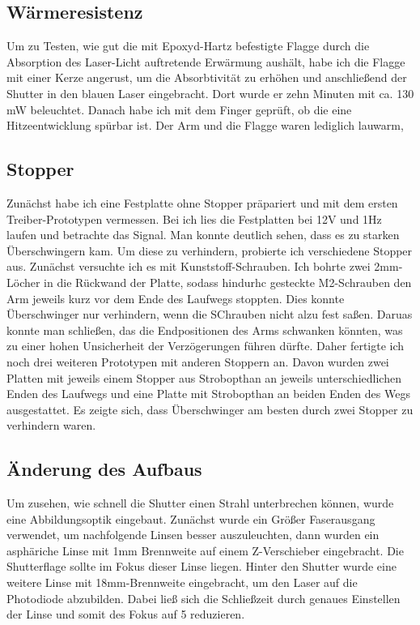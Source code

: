 \subsection{Wärmeresistenz}
Um zu Testen, wie gut die mit Epoxyd-Hartz befestigte Flagge durch die Absorption des Laser-Licht auftretende Erwärmung aushält, habe ich die Flagge mit einer Kerze angerust, um die Absorbtivität zu erhöhen und anschließend der Shutter in den blauen Laser eingebracht. Dort wurde er zehn Minuten mit ca. 130 mW beleuchtet. Danach habe ich mit dem Finger geprüft, ob die eine Hitzeentwicklung spürbar ist. Der Arm und die Flagge waren lediglich lauwarm, 

\subsection{Stopper}

Zunächst habe ich eine Festplatte ohne Stopper präpariert und mit dem ersten Treiber-Prototypen vermessen. Bei ich lies die Festplatten bei 12V und 1Hz laufen und betrachte das Signal. Man konnte deutlich sehen, dass es zu starken Überschwingern kam. Um diese zu verhindern, probierte ich verschiedene Stopper aus. Zunächst versuchte ich es mit Kunststoff-Schrauben. Ich bohrte zwei 2mm-Löcher in die Rückwand der Platte, sodass hindurhc gesteckte M2-Schrauben den Arm jeweils kurz vor dem Ende des Laufwegs stoppten. Dies konnte Überschwinger nur verhindern, wenn die SChrauben nicht alzu fest saßen. Daruas konnte man schließen, das die Endpositionen des Arms schwanken könnten, was zu einer hohen Unsicherheit der Verzögerungen führen dürfte. Daher fertigte ich noch drei weiteren Prototypen mit anderen Stoppern an. Davon wurden zwei Platten mit jeweils einem Stopper aus Strobopthan %
an jeweils unterschiedlichen Enden des Laufwegs und eine Platte mit Strobopthan an beiden Enden des Wegs ausgestattet. Es zeigte sich, dass Überschwinger am besten durch zwei Stopper zu verhindern waren.

\subsection{Änderung des Aufbaus}

Um zusehen, wie schnell die Shutter einen Strahl unterbrechen können, wurde eine Abbildungsoptik eingebaut. Zunächst wurde ein Größer Faserausgang verwendet, um nachfolgende Linsen besser auszuleuchten, dann wurden ein asphäriche Linse mit 1mm Brennweite auf einem Z-Verschieber eingebracht. Die Shutterflage sollte im Fokus dieser Linse liegen. Hinter den Shutter wurde eine weitere Linse mit 18mm-Brennweite eingebracht, um den Laser auf die Photodiode abzubilden. Dabei ließ sich die Schließzeit durch genaues Einstellen der Linse und somit des Fokus auf 5%
reduzieren.

